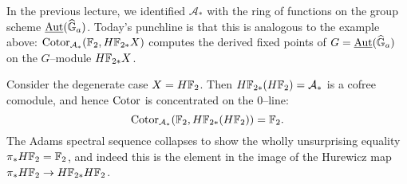 
\begin{example}\label{HF2HomologyIsValuedInAutGaEquivarModules}
In the previous lecture, we identified $\mathcal A_*$ with the ring of functions on the group scheme $\operatorname{\underline{\smash{\operatorname{Aut}}}}(\widehat{\mathbb G}_a)$.  Today's punchline is that this is analogous to the example above: $\operatorname{Cotor}_{\mathcal A_*}(\mathbb F_2, H\mathbb F_{2*} X)$ computes the derived fixed points of $G = \operatorname{\underline{\smash{\operatorname{Aut}}}}(\widehat{\mathbb G}_a)$ on the $G$--module $H\mathbb F_{2*} X$.
\end{example}

\begin{example}
Consider the degenerate case $X = H\mathbb F_2$.  Then $H\mathbb F_{2*}(H\mathbb F_2) = \mathcal A_*$ is a cofree comodule, and hence $\operatorname{Cotor}$ is concentrated on the $0$--line: \[\operatorname{Cotor}_{\mathcal A_*}(\mathbb F_2, H\mathbb F_{2*}(H\mathbb F_2)) = \mathbb F_2.\]  The Adams spectral sequence collapses to show the wholly unsurprising equality $\pi_* H\mathbb F_2 = \mathbb F_2$, and indeed this is the element in the image of the Hurewicz map $\pi_* H\mathbb F_2 \to H\mathbb F_{2*} H\mathbb F_2$.
\end{example}

